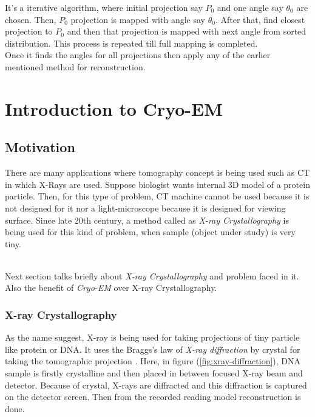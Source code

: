 \documentclass{report}
\begin{document}
\noindent
It's a iterative algorithm, where initial projection say $P_0$ and one angle say $\theta_0$ are chosen. Then, $P_0$ projection is mapped with angle say $\theta_0$. After that, find closest projection to $P_0$ and then that projection is mapped with next angle from sorted distribution. This process is repeated till full mapping is completed. \\

\noindent
Once it finds the angles for all projections then apply any of the earlier mentioned method for reconstruction. 

\chapter{Introduction to Cryo-EM}
\section{Motivation}
There are many applications where tomography concept is being used such as CT in which X-Rays are used. Suppose biologist wants internal 3D model of a protein particle. Then, for this type of problem, CT machine cannot be used because it is not designed for it nor a light-microscope because it is designed for viewing surface. Since late 20th century, a method called as \textit{X-ray Crystallography} is being used for this kind of problem, when sample (object under study) is very tiny\cite{wang2017cryo_crystal}. 

\noindent\\
Next section talks briefly about \textit{X-ray Crystallography} and problem faced in it. Also the benefit of \textit{Cryo-EM} over X-ray Crystallography.

\subsection{X-ray Crystallography}
As the name suggest, X-ray is being used for taking projections of tiny particle like protein or DNA. It uses the Braggs's law of \textit{X-ray diffraction} by crystal for taking the tomographic projection \cite{wang2017cryo_crystal} . Here, in figure (\ref{fig:xray-diffraction}), DNA sample is firstly crystalline and then  placed in between focused X-ray beam and detector. Because of crystal, X-rays are diffracted and this diffraction is captured on the detector screen. Then from the recorded reading model reconstruction is done.
\end{document}
